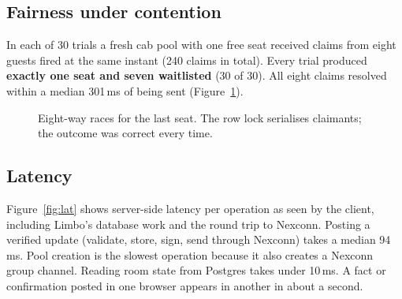 \documentclass[10pt,twocolumn]{article}
\begin{document}
\subsection{Fairness under contention}
In each of 30 trials a fresh cab pool with one free seat received claims from eight guests fired at the same instant
(240 claims in total). Every trial produced \textbf{exactly one seat and seven waitlisted} (30 of 30). All eight
claims resolved within a median 301\,ms of being sent (Figure~\ref{fig:race}).

\begin{figure}[t]
\centering
{}
\caption{Eight-way races for the last seat. The row lock serialises claimants; the outcome was correct every time.}
\label{fig:race}
\end{figure}

\subsection{Latency}
Figure~\ref{fig:lat} shows server-side latency per operation as seen by the client, including Limbo's database work and
the round trip to Nexconn. Posting a verified update (validate, store, sign, send through Nexconn) takes a median
94\,ms. Pool creation is the slowest operation because it also creates a Nexconn group channel. Reading room state
from Postgres takes under 10\,ms. A fact or confirmation posted in one browser appears in another in about a second.
\end{document}
